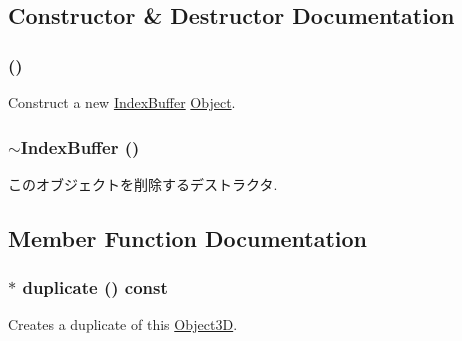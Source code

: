 \subsection{Constructor \& Destructor Documentation}
\hypertarget{classm3g_1_1IndexBuffer_d2e68a2d7c6c753d3abfeef42ee79427}{
\subsubsection[{IndexBuffer}]{ ()}}
\label{classm3g_1_1IndexBuffer_d2e68a2d7c6c753d3abfeef42ee79427}


Construct a new \hyperlink{classm3g_1_1IndexBuffer}{IndexBuffer} \hyperlink{classm3g_1_1Object}{Object}. \hypertarget{classm3g_1_1IndexBuffer_ac7952364fe4d2d7b2731da5380c841c}{
\subsubsection[{$\sim$IndexBuffer}]{\setlength{\rightskip}{0pt plus 5cm}$\sim${\bf IndexBuffer} ()}}
\label{classm3g_1_1IndexBuffer_ac7952364fe4d2d7b2731da5380c841c}


このオブジェクトを削除するデストラクタ. 

\subsection{Member Function Documentation}
\hypertarget{classm3g_1_1IndexBuffer_fab6fc0a0ec393e527f849c3af10ad76}{
\subsubsection[{duplicate}]{ $\ast$ duplicate () const}}
\label{classm3g_1_1IndexBuffer_fab6fc0a0ec393e527f849c3af10ad76}


Creates a duplicate of this \hyperlink{classm3g_1_1Object3D}{Object3D}. 

